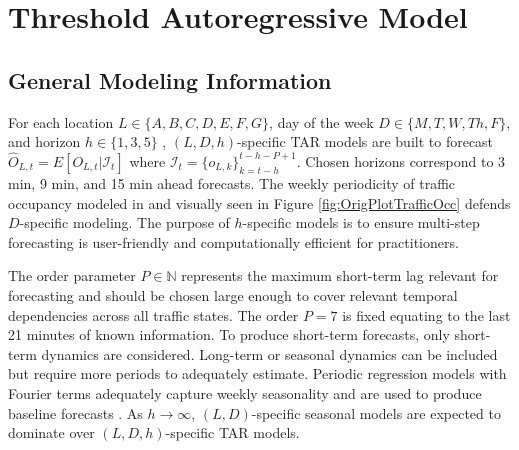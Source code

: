 \section{Threshold Autoregressive Model}
\label{sec:trafficmodels}

\subsection{General Modeling Information}
For each location $L\in \{A,B,C,D,E,F,G\}$, day of the week $D\in\{M,T,W,Th,F\}$, and horizon $h \in \{1,3,5\}$ ,  $(L,D,h)$-specific TAR models are built to forecast $\widehat{O}_{L,t}=E[O_{L,t}|\mathcal{I}_t]$ where $\mathcal{I}_t=\{o_{L,k}\}_{k=t-h}^{t-h-P+1}$. Chosen horizons correspond to 3 min, 9 min, and 15 min ahead forecasts. The weekly periodicity of traffic occupancy modeled in \cite{Williams1999,Ghosh2007,Kamarianakis2010} and visually seen in Figure \ref{fig:OrigPlotTrafficOcc} defends $D$-specific modeling. The purpose of $h$-specific models is to ensure multi-step forecasting is user-friendly and computationally efficient for practitioners. 

The order parameter $P\in\mathbb{N}$ represents the maximum short-term lag relevant for forecasting and should be chosen large enough to cover relevant temporal dependencies across all traffic states. The order $P=7$ is fixed equating to the last 21 minutes of known information. To produce short-term forecasts, only short-term dynamics are considered. Long-term or seasonal dynamics can be included but require more periods to adequately estimate. Periodic regression models with Fourier terms adequately capture weekly seasonality and are used to produce baseline forecasts \citep{Kamarianakis2010}. As $h\to\infty$, $(L,D)$-specific seasonal models are expected to dominate over $(L,D,h)$-specific TAR models.
 
